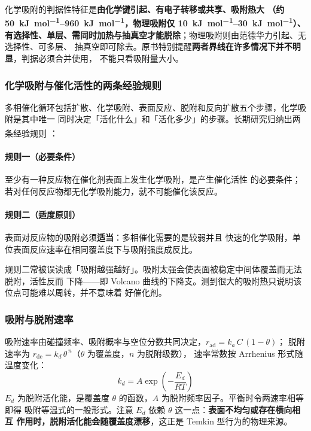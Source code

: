 化学吸附的判据性特征是\textbf{由化学键引起、有电子转移或共享、吸附热大
（约 \qtyrange{50}{960}{kJ.mol^{-1}}，物理吸附仅 \qtyrange{10}{30}{kJ.mol^{-1}}）、
有选择性、单层、需同时加热与抽真空才能脱除}；物理吸附则由范德华力引起、无选择性、可多层、
抽真空即可除去。原书特别提醒\textbf{两者界线在许多情况下并不明显}，判据必须合并使用，
不能只看吸附量大小。

\subsubsection{化学吸附与催化活性的两条经验规则}

多相催化循环包括扩散、化学吸附、表面反应、脱附和反向扩散五个步骤，化学吸附是其中唯一
同时决定「活化什么」和「活化多少」的步骤。长期研究归纳出两条经验规则
\textsuperscript{}：

\paragraph{规则一（必要条件）}至少有一种反应物在催化剂表面上发生化学吸附，是产生催化活性
的必要条件；若对任何反应物都无化学吸附能力，就不可能催化该反应。

\paragraph{规则二（适度原则）}表面对反应物的吸附必须\textbf{适当}：多相催化需要的是较弱并且
快速的化学吸附，单位表面反应速率在相同覆盖度下与吸附强度成反比。

\begin{pitfall}
规则二常被误读成「吸附越强越好」。吸附太强会使表面被稳定中间体覆盖而无法脱附，活性反而
下降——即 Volcano 曲线的下降支。测到很大的吸附热只说明该位点可能难以周转，并不意味着
好催化剂。
\end{pitfall}

\subsubsection{吸附与脱附速率}

吸附速率由碰撞频率、吸附概率与空位分数共同决定，$r_{\text{ad}} = k_a\,C\,(1-\theta)$；
脱附速率为 $r_{\text{de}} = k_d\,\theta^{\,n}$（$\theta$ 为覆盖度，$n$ 为脱附级数），
速率常数按 Arrhenius 形式随温度变化：
\begin{equation}
k_d = A\exp\!\left(-\frac{E_d}{RT}\right)
\label{eq:ch05-kd}
\end{equation}
$E_d$ 为脱附活化能，是覆盖度 $\theta$ 的函数，$A$ 为脱附频率因子。平衡时令两速率相等即得
吸附等温式的一般形式。注意 $E_d$ 依赖 $\theta$ 这一点：\textbf{表面不均匀或存在横向相互
作用时，脱附活化能会随覆盖度漂移}，这正是 Temkin 型行为的物理来源。

